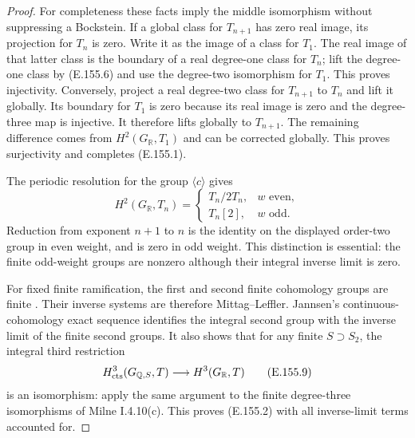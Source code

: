 \begin{proof}
For completeness these facts imply the middle isomorphism
without suppressing a Bockstein. If a global class for
\(T_{n+1}\) has zero real image, its projection for \(T_n\)
is zero. Write it as the image of a class for \(T_1\).
The real image of that latter class is the boundary of a
real degree-one class for \(T_n\); lift the degree-one class
by (E.155.6) and use the degree-two isomorphism for \(T_1\).
This proves injectivity. Conversely, project a real degree-two
class for \(T_{n+1}\) to \(T_n\) and lift it globally. Its
boundary for \(T_1\) is zero because its real image is zero
and the degree-three map is injective. It therefore lifts
globally to \(T_{n+1}\). The remaining difference comes
from \(H^2(G_{\mathbb R},T_1)\) and can be corrected globally.
This proves surjectivity and completes (E.155.1).

The periodic resolution for the group \(\langle c\rangle\)
gives
\[
 H^2(G_{\mathbb R},T_n)=
 \begin{cases}
 T_n/2T_n,&w\text{ even},\\
 T_n[2],&w\text{ odd}.
 \end{cases}
\]
Reduction from exponent \(n+1\) to \(n\) is the identity
on the displayed order-two group in even weight, and is
zero in odd weight. This distinction is essential:
the finite odd-weight groups are nonzero although their
integral inverse limit is zero.

For fixed finite ramification, the first and second finite
cohomology groups are finite
\citep[I.4.9--4.10, pp.~56--57]{CohMilneADT}.
Their inverse systems are therefore Mittag--Leffler.
Jannsen's continuous-cohomology exact sequence
\citep[(2.1) and Theorem~2.2, p.~215]{CohJannsen1988}
identifies the integral second group with the inverse
limit of the finite second groups. It also shows that
for any finite \(S\supset S_2\), the integral third
restriction
\[
 H^3_{\rm cts}(G_{\mathbb Q,S},T)
       \longrightarrow H^3(G_{\mathbb R},T)
 \tag{E.155.9}
\]
is an isomorphism: apply the same argument to the finite
degree-three isomorphisms of Milne I.4.10(c).
This proves (E.155.2) with all inverse-limit terms accounted for.


\end{proof}
